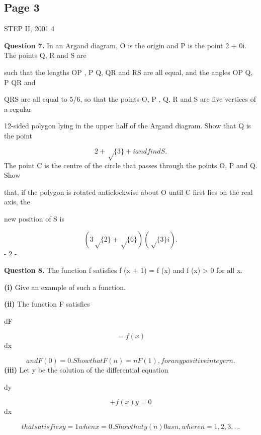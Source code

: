\documentclass[12pt]{article}
\begin{document}
\subsection*{Page 3}
\begin{flushleft}
STEP II, 2001 4\par
\bigskip\textbf{Question 7.} In an Argand diagram, O is the origin and P is the point 2 + 0i. The points Q, R and S are\par
such that the lengths OP , P Q, QR and RS are all equal, and the angles OP Q, P QR and\par
QRS are all equal to 5\pi/6, so that the points O, P , Q, R and S are five vertices of a regular\par
12-sided polygon lying in the upper half of the Argand diagram. Show that Q is the point\par
\[2 + \sqrt\{3\} + i and find S.\]
The point C is the centre of the circle that passes through the points O, P and Q. Show\par
that, if the polygon is rotated anticlockwise about O until C first lies on the real axis, the\par
new position of S is\par
\[(3\sqrt\{2\} + \sqrt\{6\})(\sqrt\{3\} i) .\]
- 2 -\par
\bigskip\textbf{Question 8.} The function f satisfies f (x + 1) = f (x) and f (x) > 0 for all x.\par
\textbf{(i)} Give an example of such a function.\par
\textbf{(ii)} The function F satisfies\par
dF\par
\[= f (x)\]
dx\par
\[and F(0) = 0. Show that F(n) = nF(1), for any positive integer n.\]
\textbf{(iii)} Let y be the solution of the differential equation\par
dy\par
\[+ f (x)y = 0\]
dx\par
\[that satisfies y = 1 when x = 0. Show that y(n) 0 as n , where n = 1, 2, 3, . . .\]
\to \to \infty\par
\end{flushleft}
\end{document}
